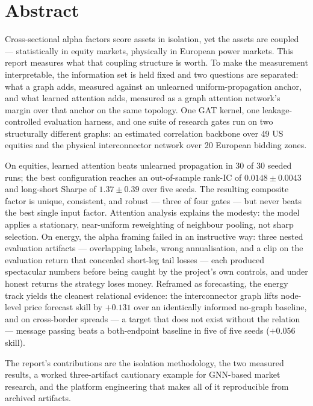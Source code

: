 \chapter*{Abstract}

Cross-sectional alpha factors score assets in isolation, yet the assets
are coupled --- statistically in equity markets, physically in European
power markets. This report measures what that coupling structure is
worth. To make the measurement interpretable, the information set is
held fixed and two questions are separated: what a graph adds, measured
against an unlearned uniform-propagation anchor, and what learned
attention adds, measured as a graph attention network's margin over that
anchor on the same topology. One GAT kernel, one leakage-controlled
evaluation harness, and one suite of research gates run on two
structurally different graphs: an estimated correlation backbone over 49
US equities and the physical interconnector network over 20 European
bidding zones.

On equities, learned attention beats unlearned propagation in 30 of 30
seeded runs; the best configuration reaches an out-of-sample rank-IC of
$0.0148 \pm 0.0043$ and long-short Sharpe of $1.37 \pm 0.39$ over five
seeds. The resulting composite factor is unique, consistent, and robust
--- three of four gates --- but never beats the best single input
factor. Attention analysis explains the modesty: the model applies a
stationary, near-uniform reweighting of neighbour pooling, not sharp
selection. On energy, the alpha framing failed in an instructive way:
three nested evaluation artifacts --- overlapping labels, wrong
annualisation, and a clip on the evaluation return that concealed
short-leg tail losses --- each produced spectacular numbers before
being caught by the project's own controls, and under honest returns
the strategy loses money. Reframed as forecasting, the energy track
yields the cleanest relational evidence: the interconnector graph lifts
node-level price forecast skill by $+0.131$ over an identically
informed no-graph baseline, and on cross-border spreads --- a target
that does not exist without the relation --- message passing beats a
both-endpoint baseline in five of five seeds ($+0.056$ skill).

The report's contributions are the isolation methodology, the two
measured results, a worked three-artifact cautionary example for
GNN-based market research, and the platform engineering that makes all
of it reproducible from archived artifacts.
